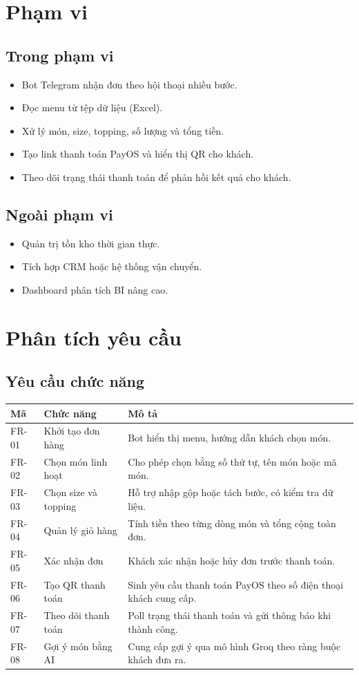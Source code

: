 \documentclass[12pt,a4paper]{article}
\begin{document}
\section{Phạm vi}
\subsection{Trong phạm vi}
\begin{itemize}
    \item Bot Telegram nhận đơn theo hội thoại nhiều bước.
    \item Đọc menu từ tệp dữ liệu (Excel).
    \item Xử lý món, size, topping, số lượng và tổng tiền.
    \item Tạo link thanh toán PayOS và hiển thị QR cho khách.
    \item Theo dõi trạng thái thanh toán để phản hồi kết quả cho khách.
\end{itemize}

\subsection{Ngoài phạm vi}
\begin{itemize}
    \item Quản trị tồn kho thời gian thực.
    \item Tích hợp CRM hoặc hệ thống vận chuyển.
    \item Dashboard phân tích BI nâng cao.
\end{itemize}

\section{Phân tích yêu cầu}
\subsection{Yêu cầu chức năng}
\begin{longtable}{p{1.5cm}p{4cm}p{8.5cm}}
\toprule
\textbf{Mã} & \textbf{Chức năng} & \textbf{Mô tả} \\
\midrule
FR-01 & Khởi tạo đơn hàng & Bot hiển thị menu, hướng dẫn khách chọn món. \\
FR-02 & Chọn món linh hoạt & Cho phép chọn bằng số thứ tự, tên món hoặc mã món. \\
FR-03 & Chọn size và topping & Hỗ trợ nhập gộp hoặc tách bước, có kiểm tra dữ liệu. \\
FR-04 & Quản lý giỏ hàng & Tính tiền theo từng dòng món và tổng cộng toàn đơn. \\
FR-05 & Xác nhận đơn & Khách xác nhận hoặc hủy đơn trước thanh toán. \\
FR-06 & Tạo QR thanh toán & Sinh yêu cầu thanh toán PayOS theo số điện thoại khách cung cấp. \\
FR-07 & Theo dõi thanh toán & Poll trạng thái thanh toán và gửi thông báo khi thành công. \\
FR-08 & Gợi ý món bằng AI & Cung cấp gợi ý qua mô hình Groq theo ràng buộc khách đưa ra. \\
\bottomrule
\end{longtable}
\end{document}
